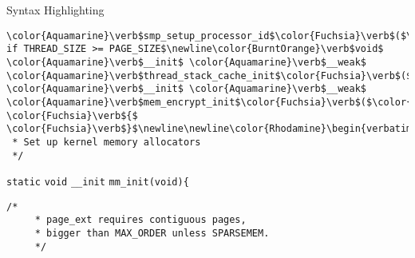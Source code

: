 \begin{frame}{Syntax Highlighting}
\begin{verbatim}
\color{Aquamarine}\verb$smp_setup_processor_id$\color{Fuchsia}\verb$($\color{BurntOrange}\verb$void$\color{Fuchsia}\verb$)$\newline\color{Fuchsia}\verb${$\newline\color{Fuchsia}\verb$}$\newline\newline\color{Gray}\verb$# if THREAD_SIZE >= PAGE_SIZE$\newline\color{BurntOrange}\verb$void$ \color{Aquamarine}\verb$__init$ \color{Aquamarine}\verb$__weak$ \color{Aquamarine}\verb$thread_stack_cache_init$\color{Fuchsia}\verb$($\color{BurntOrange}\verb$void$\color{Fuchsia}\verb$)$\newline\color{Fuchsia}\verb${$\newline\color{Fuchsia}\verb$}$\newline\color{Gray}\verb$#endif$\newline\newline\color{BurntOrange}\verb$void$ \color{Aquamarine}\verb$__init$ \color{Aquamarine}\verb$__weak$ \color{Aquamarine}\verb$mem_encrypt_init$\color{Fuchsia}\verb$($\color{BurntOrange}\verb$void$\color{Fuchsia}\verb$)$ \color{Fuchsia}\verb${$ \color{Fuchsia}\verb$}$\newline\newline\color{Rhodamine}\begin{verbatim}/*
 * Set up kernel memory allocators
 */\end{verbatim}\leavevmode\newline\color{BurntOrange}\verb$static$ \color{BurntOrange}\verb$void$ \color{Aquamarine}\verb$__init$ \color{Aquamarine}\verb$mm_init$\color{Fuchsia}\verb$($\color{BurntOrange}\verb$void$\color{Fuchsia}\verb$)$\newline\color{Fuchsia}\verb${$\newline\tab\color{Rhodamine}\begin{verbatim}/*
	 * page_ext requires contiguous pages,
	 * bigger than MAX_ORDER unless SPARSEMEM.
	 */\end{verbatim}\leavevmode
\end{frame}
